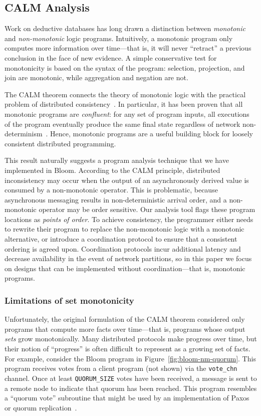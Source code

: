 \subsection{CALM Analysis}
\label{sec:bg-calm}

Work on deductive databases has long drawn a distinction between
\emph{monotonic} and \emph{non-monotonic} logic programs. Intuitively, a
monotonic program only computes more information over time---that is, it will
never ``retract'' a previous conclusion in the face of new evidence. A simple
conservative test for monotonicity is based on the syntax of the program:
selection, projection, and join are monotonic, while aggregation and negation
are not.

The CALM theorem connects the theory of monotonic logic with the practical
problem of distributed consistency~\cite{Alvaro2011,Hellerstein2010}. In
particular, it has been proven that all monotonic programs are \emph{confluent}:
for any set of program inputs, all executions of the program eventually produce
the same final state regardless of network
non-determinism~\cite{Ameloot2011}. Hence, monotonic programs are a useful
building block for loosely consistent distributed programming.

This result naturally suggests a program analysis technique that we have
implemented in Bloom. According to the CALM principle, distributed inconsistency
may occur when the output of an asynchronously derived value is consumed by a
non-monotonic operator. This is problematic, because asynchronous messaging
results in non-deterministic arrival order, and a non-monotonic operator may be
order sensitive. Our analysis tool flags these program locations as \emph{points
  of order}. To achieve consistency, the programmer either needs to rewrite
their program to replace the non-monotonic logic with a monotonic alternative,
or introduce a coordination protocol to ensure that a consistent ordering is
agreed upon. Coordination protocols incur additional latency and decrease
availability in the event of network partitions, so in this paper we focus on
designs that can be implemented without coordination---that is, monotonic
programs.

\subsubsection{Limitations of set monotonicity}
Unfortunately, the original formulation of the CALM theorem considered only
programs that compute more facts over time---that is, programs whose output
\emph{sets} grow monotonically. Many distributed protocols make progress
over time, but their notion of ``progress'' is often difficult to represent as a
growing set of facts. For example, consider the Bloom program in
Figure~\ref{fig:bloom-nm-quorum}. This program receives votes from a client
program (not shown) via the \texttt{vote\_chn} channel. Once at least
\texttt{QUORUM\_SIZE} votes have been received, a message is sent to a remote
node to indicate that quorum has been reached. This program resembles a ``quorum
vote'' subroutine that might be used by an implementation of
Paxos~\cite{Lamport1998} or quorum replication~\cite{Gifford1979}.


